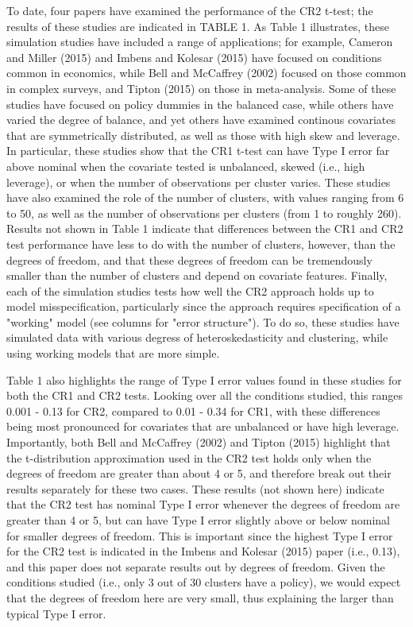 \documentclass[12pt]{article}\usepackage[]{graphicx}\usepackage[]{color}
\begin{document}
To date, four papers have examined the performance of the CR2 t-test; the results of these studies are indicated in TABLE 1. 
As Table 1 illustrates, these simulation studies have included a range of applications; for example, Cameron and Miller (2015) and Imbens and Kolesar (2015) have focused on conditions common in economics, while Bell and McCaffrey (2002) focused on those common in complex surveys, and Tipton (2015) on those in meta-analysis. 
Some of these studies have focused on policy dummies in the balanced case, while others have varied the degree of balance, and yet others have examined continous covariates that are symmetrically distributed, as well as those with high skew and leverage.
In particular, these studies show that the CR1 t-test can have Type I error far above nominal when the covariate tested is unbalanced, skewed (i.e., high leverage), or when the number of observations per cluster varies. 
These studies have also examined the role of the number of clusters, with values ranging from 6 to 50, as well as the number of observations per clusters (from 1 to roughly 260).
Results not shown in Table 1 indicate that differences between the CR1 and CR2 test performance have less to do with the number of clusters, however, than the degrees of freedom, and that these degrees of freedom can be tremendously smaller than the number of clusters and depend on covariate features.
Finally, each of the simulation studies tests how well the CR2 approach holds up to model misspecification, particularly since the approach requires specification of a "working" model (see columns for "error structure").
To do so, these studies have simulated data with various degress of heteroskedasticity and clustering, while using working models that are more simple.

Table 1 also highlights the range of Type I error values found in these studies for both the CR1 and CR2 tests.
Looking over all the conditions studied, this ranges 0.001 - 0.13 for CR2, compared to 0.01 - 0.34 for CR1, with these differences being most pronounced for covariates that are unbalanced or have high leverage.
Importantly, both Bell and McCaffrey (2002) and Tipton (2015) highlight that the t-distribution approximation used in the CR2 test holds only when the degrees of freedom are greater than about 4 or 5, and therefore break out their results separately for these two cases.
These results (not shown here) indicate that the CR2 test has nominal Type I error whenever the degrees of freedom are greater than 4 or 5, but can have Type I error slightly above or below nominal for smaller degrees of freedom.
This is important since the highest Type I error for the CR2 test is indicated in the Imbens and Kolesar (2015) paper (i.e., 0.13), and this paper does not separate results out by degrees of freedom. 
Given the conditions studied (i.e., only 3 out of 30 clusters have a policy), we would expect that the degrees of freedom here are very small, thus explaining the larger than typical Type I error.
\end{document}
